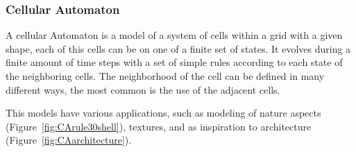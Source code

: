 
\subsubsection{Cellular Automaton} %
\label{sub:cellular_automaton}

A cellular Automaton is a model of a system of cells within a grid with a given shape, each of this cells can be on one of a finite set of states. It evolves during a finite amount of time steps with a set of simple rules according to each state of the neighboring cells.
The neighborhood of the cell can be defined in many different ways, the most common is the use of the adjacent cells. 

This models have various applications, such as modeling of nature aspects (Figure~\ref{fig:CArule30shell}), textures, and as inspiration to architecture (Figure~\ref{fig:CAarchitecture}).

